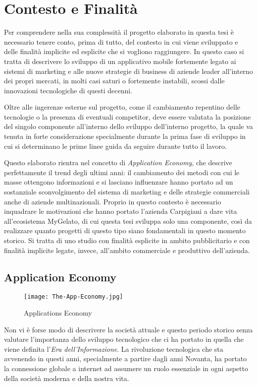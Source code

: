 \section{Contesto e Finalità}

Per comprendere nella sua complessità il progetto elaborato in questa tesi è necessario tenere conto, prima di tutto, del contesto in cui viene sviluppato e delle finalità implicite ed esplicite che si vogliono raggiungere.
In questo caso si tratta di descrivere lo sviluppo di un applicativo mobile fortemente legato ai sistemi di marketing e alle nuove strategie di business di aziende leader all'interno dei propri mercati, in molti casi saturi o fortemente instabili, scossi dalle innovazioni tecnologiche di questi decenni.

Oltre alle ingerenze esterne sul progetto, come il cambiamento repentino delle tecnologie o la presenza di eventuali competitor, deve essere valutata la posizione del singolo componente all'interno dello sviluppo dell'interno progetto, la quale va tenuta in forte considerazione specialmente durante la prima fase di sviluppo in cui si determinano le prime linee guida da seguire durante tutto il lavoro.

Questo elaborato rientra nel concetto di \textit{Application Economy}, che descrive perfettamente il trend degli ultimi anni: il cambiamento dei metodi con cui le masse ottengono informazioni e si lasciano influenzare hanno portato ad un sostanziale sconvolgimento del sistema di marketing e delle strategie commerciali anche di aziende multinazionali. 
Proprio in questo contesto è necessario inquadrare le motivazioni che hanno portato l'azienda Carpigiani a dare vita all'ecosistema MyGelato, di cui questa tesi sviluppa solo una componente, così da realizzare quanto progetti di questo tipo siano fondamentali in questo momento storico.
Si tratta di uno studio con finalità esplicite in ambito pubblicitario e con finalità implicite legate, invece, all'ambito commerciale e produttivo dell'azienda.


\subsection{Application Economy}
  
\begin{figure}[h]
  \texttt{[image: The-App-Economy.jpg]}
  \caption{Applications Economy}
  \label{fig:appEconomy1}
\end{figure}
  
Non vi è forse modo di descrivere la società attuale e questo periodo storico senza valutare l'importanza dello sviluppo tecnologico che ci ha portato in quella che viene definita l'\textit{Era dell'Informazione}.
La rivoluzione tecnologica che sta avvenendo in questi anni, specialmente a partire dagli anni Novanta, ha portato la connessione globale a internet ad assumere un ruolo essenziale in ogni aspetto della società moderna e della nostra vita.

